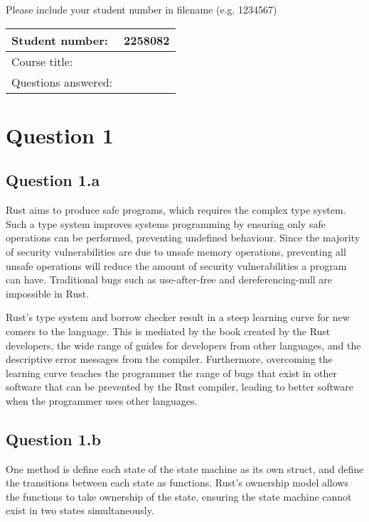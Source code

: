 \documentclass[]{article}
\author{2258082}
\date{\today}
\begin{document}
Please include your student number in filename (e.g. 1234567)

\begin{tabulary}{0.7\textwidth}{LL}
	\toprule
	Student number: & 2258082 \\
	\midrule
	Course title: & \\
	\midrule
	Questions answered: & \\
	\bottomrule
\end{tabulary}
\pagebreak

\section{Question 1}
\subsection{Question 1.a}
Rust aims to produce safe programs, which requires the complex type system.
Such a type system improves systems programming by ensuring only safe
operations can be performed, preventing undefined behaviour.
Since the majority of security vulnerabilities are due to unsafe memory
operations, preventing all unsafe operations will reduce the amount of security
vulnerabilities a program can have.
Traditional bugs such as use-after-free and dereferencing-null are impossible
in Rust.

Rust's type system and borrow checker result in a steep learning curve for new
comers to the language.
This is mediated by the book created by the Rust developers, the wide range of
guides for developers from other languages, and the descriptive error messages
from the compiler.
Furthermore, overcoming the learning curve teaches the programmer the range of
bugs that exist in other software that can be prevented by the Rust compiler,
leading to better software when the programmer uses other languages.

\subsection{Question 1.b}
One method is define each state of the state machine as its own struct, and
define the transitions between each state as functions.
Rust's ownership model allows the functions to take ownership of the state,
ensuring the state machine cannot exist in two states simultaneously.
\end{document}
